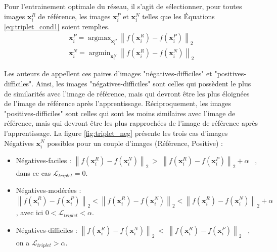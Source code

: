 Pour l'entrainement optimale du réseau, il s'agit de sélectionner, pour toutes images $\mathbf{x}_{i}^{R}$ de référence, les images $\mathbf{x}_{i}^{P}$ et $\mathbf{x}_{i}^{N}$ telles que les Équations \ref{eq:triplet_cond1} soient remplies.
\begin{equation} \label{eq:triplet_cond1}
\begin{split}
\mathbf{x}_{i}^{P}=\operatorname{argmax}_{\mathbf{x}_{i}^{P}}\left\|f\left(\mathbf{x}_{i}^{R}\right)-f\left(\mathbf{x}_{i}^{P}\right)\right\|_{2}
\\
\mathbf{x}_{i}^{N}=\operatorname{argmin}_{\mathbf{x}_{i}^{N}}\left\|f\left(\mathbf{x}_{i}^{R}\right)-f\left(\mathbf{x}_{i}^{N}\right)\right\|_{2}
\end{split}
\end{equation}

Les auteurs de \cite{schroff_facenet_2015} appellent ces paires d'images "négatives-difficiles" et "positives-difficiles". 
Ainsi, les images "négatives-difficiles" sont celles qui possèdent le plus de similarités avec l'image de référence, mais qui devront être les plus éloignées de l'image de référence après l'apprentissage.
Réciproquement, les images "positives-difficiles" sont celles qui sont les moins similaires avec l'image de référence, mais qui devront être les plus rapprochées de l'image de référence après l'apprentissage.
La figure \ref{fig:triplet_neg} présente les trois cas d'images Négatives $\mathbf{x}_{i}^{N}$ possibles pour un couple d'images (Référence, Positive) :
\begin{itemize}
    \item Négatives-faciles : $\left\|f\left(\mathbf{x}_{i}^{R}\right)-f\left(\mathbf{x}_{i}^{N}\right)\right\|_{2} \ > \ \left\|f\left(\mathbf{x}_{i}^{R}\right)-f\left(\mathbf{x}_{i}^{P}\right)\right\|_{2}+\alpha$ \ , dans ce cas $\mathcal{L}_{triplet}=0$.
    \item Négatives-modérées : $\left\|f\left(\mathbf{x}_{i}^{R}\right)-f\left(\mathbf{x}_{i}^{P}\right)\right\|_{2} < \left\|f\left(\mathbf{x}_{i}^{R}\right)-f\left(\mathbf{x}_{i}^{N}\right)\right\|_{2} < \left\|f\left(\mathbf{x}_{i}^{R}\right)-f\left(\mathbf{x}_{i}^{N}\right)\right\|_{2}+\alpha$, avec ici $0 < \mathcal{L}_{triplet} < \alpha$.
    \item Négatives-difficiles : $\left\|f\left(\mathbf{x}_{i}^{R}\right)-f\left(\mathbf{x}_{i}^{N}\right)\right\|_{2} \ < \ \left\|f\left(\mathbf{x}_{i}^{R}\right)-f\left(\mathbf{x}_{i}^{P}\right)\right\|_{2}$ \ , on a $\mathcal{L}_{triplet} > \alpha$.
\end{itemize}

